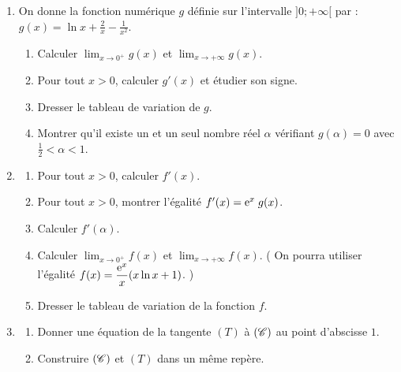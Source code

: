       \begin{enumerate}
            \item On donne la fonction num\'erique $g$ d\'efinie sur l'intervalle $]0;+\infty[$ par : 
                  $\displaystyle{g(x) = \ln x + \frac{2}{x} - \frac{1}{x^2}}$.
                  \label{quest: Bac D 2004 Pbm quest 1}
                  \begin{enumerate}
                        \item Calculer $\displaystyle{\lim_{x\rightarrow 0^+} g(x)}$ et 
                              $\displaystyle{\lim_{x\rightarrow +\infty} g(x)}$.
                        \item Pour tout $x > 0$, calculer $g'(x)$ et \'etudier son signe.
                        \item Dresser le tableau de variation de $g$.
                        \item Montrer qu'il existe un et un seul nombre r\'eel $\alpha$ v\'erifiant $g(\alpha) = 0$
                              avec $\frac{1}{2} < \alpha < 1$.
                        \label{quest: Bac D 2004 Pbm quest 1/ d)}
                  \end{enumerate}
            \item \begin{enumerate}
                        \item Pour tout $x > 0$, calculer $f'(x)$.
                        \item Pour tout $x > 0$, montrer l'\'egalit\'e $f'(x) = \mathrm{e}^{x} \; g(x)$.
                        \item Calculer $f'(\alpha)$.
                        \item Calculer $\displaystyle{\lim_{x\rightarrow 0^+} f(x)}$ et 
                              $\displaystyle{\lim_{x\rightarrow +\infty} f(x)}$.
                              \Big( 
                                    On pourra utiliser l'\'egalit\'e $\displaystyle{f(x) = \frac{\mathrm{e}^{x}}{x} (x \ln x + 1)}$.
                              \Big)
                        \item Dresser le tableau de variation de la fonction $f$.
                  \end{enumerate}
            \item \begin{enumerate}
                        \item Donner une \'equation de la tangente $(T)$ \`a $(\mathscr{C})$ au point d'abscisse $1$.
                        \item Construire $(\mathscr{C})$ et $(T)$ dans un m\^eme rep\`ere.

\end{enumerate}
\end{enumerate}
